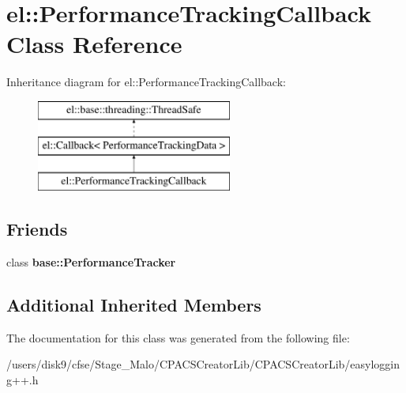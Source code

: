 \hypertarget{classel_1_1PerformanceTrackingCallback}{\section{el\-:\-:Performance\-Tracking\-Callback Class Reference}
\label{classel_1_1PerformanceTrackingCallback}
}
Inheritance diagram for el\-:\-:Performance\-Tracking\-Callback\-:\begin{figure}[H]
\begin{center}
\leavevmode
\includegraphics[height=3.000000cm]{classel_1_1PerformanceTrackingCallback}
\end{center}
\end{figure}
\subsection*{Friends}
\begin{DoxyCompactItemize}
\item 
\hypertarget{classel_1_1PerformanceTrackingCallback_a05f271f9cc2531409fe682c6ce0d9feb}{class {\bfseries base\-::\-Performance\-Tracker}}\label{classel_1_1PerformanceTrackingCallback_a05f271f9cc2531409fe682c6ce0d9feb}

\end{DoxyCompactItemize}
\subsection*{Additional Inherited Members}


The documentation for this class was generated from the following file\-:\begin{DoxyCompactItemize}
\item 
/users/disk9/cfse/\-Stage\-\_\-\-Malo/\-C\-P\-A\-C\-S\-Creator\-Lib/\-C\-P\-A\-C\-S\-Creator\-Lib/easylogging++.\-h\end{DoxyCompactItemize}

